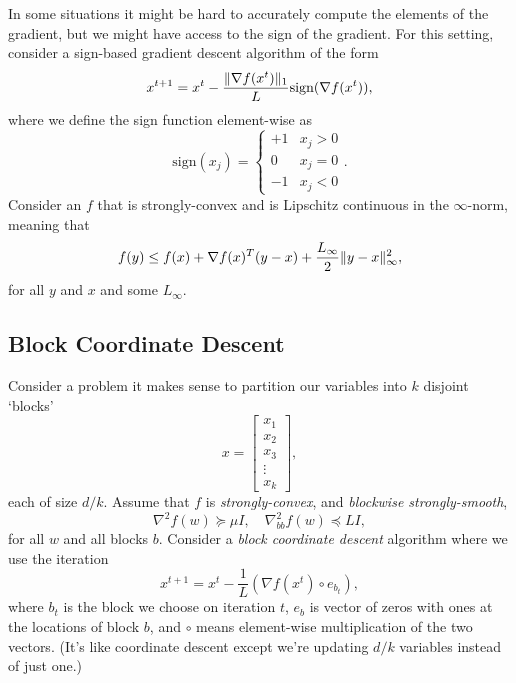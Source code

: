 \documentclass{article}
\begin{document}
In some situations it might be hard to accurately compute the elements of the gradient, but we might have access to the sign of the gradient. For this setting, consider a sign-based gradient descent algorithm of the form
\[
x^{t+1} = x^t - \frac{\|\nabla f(x^t)\|_1}{L}\text{sign}(\nabla f(x^t)),
\]
where we define the sign function element-wise as
\[
\text{sign}(x_j) = \begin{cases}+1 & x_j > 0\\0 & x_j =0\\-1 & x_j < 0\end{cases}.
\]
Consider an $f$ that is strongly-convex and is Lipschitz continuous in the $\infty$-norm, meaning that
\[
f(y) \leq f(x) + \nabla f(x)^T(y-x) + \frac{L_\infty}{2}\|y-x\|_\infty^2,
\]
for all $y$ and $x$ and some $L_\infty$. 

\subsection{Block Coordinate Descent}

Consider a problem it makes sense to partition our variables into $k$ disjoint `blocks'
\[
x = \begin{bmatrix}x_1\\x_2\\x_3\\\vdots\\x_k\end{bmatrix},
\]
each of size $d/k$. Assume that $f$ is \emph{strongly-convex}, and \emph{blockwise strongly-smooth},
\[
\nabla^2 f(w) \succeq \mu I, \quad \nabla_{bb}^2 f(w) \preceq LI,
\]
for all $w$ and all blocks $b$.
Consider a \emph{block coordinate descent} algorithm where we use the iteration
\[
x^{t+1} = x^t - \frac{1}{L}(\nabla f(x^t)\circ e_{b_t}),
\]
where $b_t$ is the block we choose on iteration $t$, $e_b$ is vector of zeros with ones at the locations of block $b$, and $\circ$ means element-wise multiplication of the two vectors. (It's like coordinate descent except we're updating $d/k$ variables instead of just one.)
\end{document}
